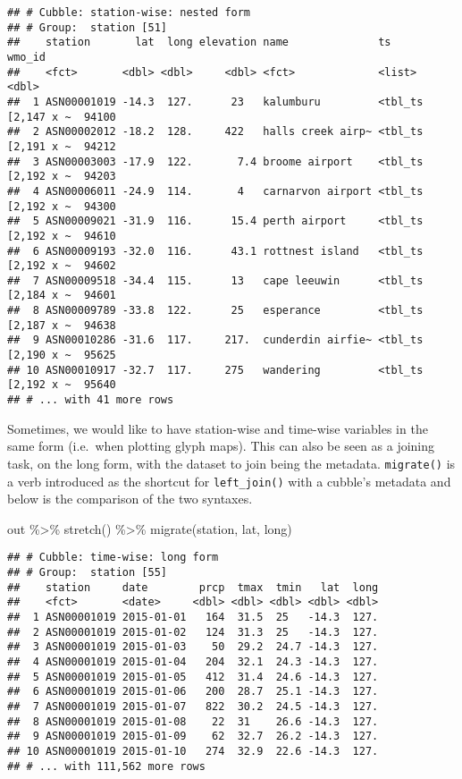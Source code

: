 \documentclass{article}
\newenvironment{Shaded}{\begin{snugshade}}{\end{snugshade}}
\newcommand{\FunctionTok}[1]{\textcolor[rgb]{0.00,0.00,0.00}{#1}}
\newcommand{\NormalTok}[1]{#1}
\newcommand{\SpecialCharTok}[1]{\textcolor[rgb]{0.00,0.00,0.00}{#1}}
\begin{document}
\begin{verbatim}
## # Cubble: station-wise: nested form
## # Group:  station [51]
##    station       lat  long elevation name              ts                 wmo_id
##    <fct>       <dbl> <dbl>     <dbl> <fct>             <list>              <dbl>
##  1 ASN00001019 -14.3  127.      23   kalumburu         <tbl_ts [2,147 x ~  94100
##  2 ASN00002012 -18.2  128.     422   halls creek airp~ <tbl_ts [2,191 x ~  94212
##  3 ASN00003003 -17.9  122.       7.4 broome airport    <tbl_ts [2,192 x ~  94203
##  4 ASN00006011 -24.9  114.       4   carnarvon airport <tbl_ts [2,192 x ~  94300
##  5 ASN00009021 -31.9  116.      15.4 perth airport     <tbl_ts [2,192 x ~  94610
##  6 ASN00009193 -32.0  116.      43.1 rottnest island   <tbl_ts [2,192 x ~  94602
##  7 ASN00009518 -34.4  115.      13   cape leeuwin      <tbl_ts [2,184 x ~  94601
##  8 ASN00009789 -33.8  122.      25   esperance         <tbl_ts [2,187 x ~  94638
##  9 ASN00010286 -31.6  117.     217.  cunderdin airfie~ <tbl_ts [2,190 x ~  95625
## 10 ASN00010917 -32.7  117.     275   wandering         <tbl_ts [2,192 x ~  95640
## # ... with 41 more rows
\end{verbatim}

Sometimes, we would like to have station-wise and time-wise variables in
the same form (i.e.~when plotting glyph maps). This can also be seen as
a joining task, on the long form, with the dataset to join being the
metadata. \texttt{migrate()} is a verb introduced as the shortcut for
\texttt{left\_join()} with a cubble's metadata and below is the
comparison of the two syntaxes.

\begin{Shaded}
\begin{Highlighting}[]
\NormalTok{out }\SpecialCharTok{\%\textgreater{}\%} 
  \FunctionTok{stretch}\NormalTok{() }\SpecialCharTok{\%\textgreater{}\%} 
  \FunctionTok{migrate}\NormalTok{(station, lat, long)}
\end{Highlighting}
\end{Shaded}

\begin{verbatim}
## # Cubble: time-wise: long form
## # Group:  station [55]
##    station     date        prcp  tmax  tmin   lat  long
##    <fct>       <date>     <dbl> <dbl> <dbl> <dbl> <dbl>
##  1 ASN00001019 2015-01-01   164  31.5  25   -14.3  127.
##  2 ASN00001019 2015-01-02   124  31.3  25   -14.3  127.
##  3 ASN00001019 2015-01-03    50  29.2  24.7 -14.3  127.
##  4 ASN00001019 2015-01-04   204  32.1  24.3 -14.3  127.
##  5 ASN00001019 2015-01-05   412  31.4  24.6 -14.3  127.
##  6 ASN00001019 2015-01-06   200  28.7  25.1 -14.3  127.
##  7 ASN00001019 2015-01-07   822  30.2  24.5 -14.3  127.
##  8 ASN00001019 2015-01-08    22  31    26.6 -14.3  127.
##  9 ASN00001019 2015-01-09    62  32.7  26.2 -14.3  127.
## 10 ASN00001019 2015-01-10   274  32.9  22.6 -14.3  127.
## # ... with 111,562 more rows
\end{verbatim}
\end{document}
